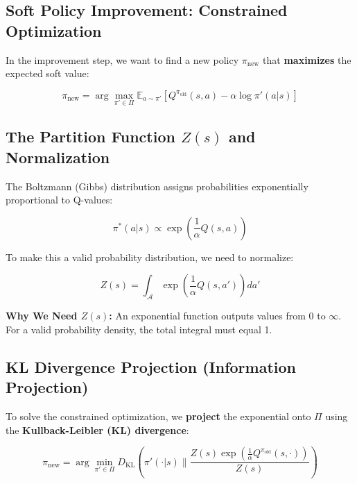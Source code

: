 \documentclass[12pt,a4paper]{article}
\theoremstyle{noteplain}
\theoremstyle{noteexercise}
\begin{document}
\subsection{Soft Policy Improvement: Constrained Optimization}\label{ssec:improvement}



In the improvement step, we want to find a new policy $\pi_{\text{new}}$ that \textbf{maximizes} the expected soft value:

\begin{equation}\label{eq:improvement}
\pi_{\text{new}} = \arg\max_{\pi' \in \Pi} \mathbb{E}_{a \sim \pi'}\left[Q^{\pi_{\text{old}}}(s,a) - \alpha \log\pi'(a|s)\right]
\end{equation}



\subsection{The Partition Function $Z(s)$ and Normalization}\label{ssec:partition}



The Boltzmann (Gibbs) distribution assigns probabilities exponentially proportional to Q-values:

$$\pi^*(a|s) \propto \exp\left(\frac{1}{\alpha}Q(s,a)\right)$$

To make this a valid probability distribution, we need to normalize:

\begin{equation}\label{eq:partition}
\boxed{Z(s) = \int_{\mathcal{A}} \exp\left(\frac{1}{\alpha}Q(s, a')\right) da'}
\end{equation}

\textbf{Why We Need $Z(s)$:} An exponential function outputs values from $0$ to $\infty$. For a valid probability density, the total integral must equal 1.



\subsection{KL Divergence Projection (Information Projection)}\label{ssec:kl-projection}



To solve the constrained optimization, we \textbf{project} the exponential onto $\Pi$ using the \textbf{Kullback-Leibler (KL) divergence}:

\begin{equation}\label{eq:kl-proj}
\pi_{\text{new}} = \arg\min_{\pi' \in \Pi} D_{\text{KL}}\left(\pi'(\cdot|s) \| \frac{Z(s)\exp\left(\frac{1}{\alpha}Q^{\pi_{\text{old}}}(s,\cdot)\right)}{Z(s)}\right)
\end{equation}
\end{document}
